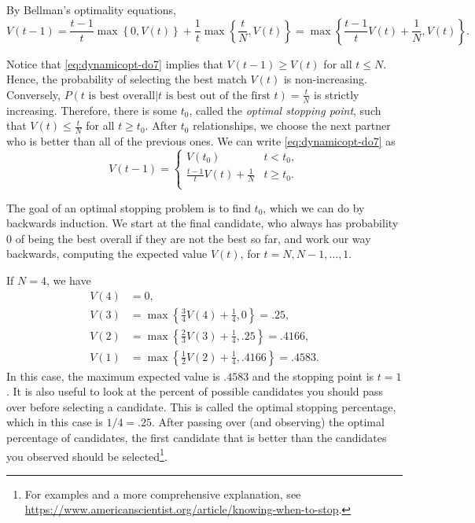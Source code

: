 By Bellman's optimality equations,
\begin{equation}
\label{eq:dynamicopt-do7}
V(t-1) = \frac{t-1}{t}\max\left\{0,V(t)\right\}+\frac{1}{t}\max\left\{ \frac{t}{N},V(t)\right\} = \max\left\{\frac{t-1}{t}V(t)+\frac{1}{N},V(t)\right\}.
\end{equation}

Notice that \eqref{eq:dynamicopt-do7} implies that $V(t-1)\geq V(t)$ for all $t\leq N$.
Hence, the probability of selecting the best match $V(t)$ is non-increasing.
Conversely, $P(t \text{ is best overall}|\text{$t$ is best out of the first $t$})=\frac{t}{N}$ is strictly increasing.
Therefore, there is some $t_0$, called the \emph{optimal stopping point}, such that $V(t)\leq\frac{t}{N}$ for all $t\geq t_0$.
After $t_0$ relationships, we choose the next partner who is better than all of the previous ones.
We can write \eqref{eq:dynamicopt-do7} as
\[
V(t-1) =
    \begin{cases}
    V(t_0) & t<t_0,\\
    \frac{t-1}{t}V(t)+\frac{1}{N} & t\geq t_0.\\
    \end{cases}
\]

The goal of an optimal stopping problem is to find $t_0$, which we can do by backwards induction.
We start at the final candidate, who always has probability $0$ of being the best overall if they are not the best so far, and work our way backwards, computing the expected value $V(t)$, for $t=N,N-1,\ldots,1$.

If $N=4$, we have
\begin{align*}
V(4) &= 0, \\
V(3) &= \max\left\{\frac{3}{4}V(4)+\frac{1}{4},0\right\} = .25,\\
V(2) &= \max\left\{\frac{2}{3}V(3)+\frac{1}{4},.25\right\} = .4166,\\
V(1) &= \max\left\{\frac{1}{2}V(2)+\frac{1}{4},.4166\right\}= .4583.
\end{align*}
In this case, the maximum expected value is $.4583$ and the stopping point is $t=1$.
It is also useful to look at the percent of possible candidates you should pass over before selecting a candidate.
This is called the optimal stopping percentage, which in this case is $1/4=.25$.
After passing over (and observing) the optimal percentage of candidates, the first candidate that is better than the candidates you observed should be selected\footnote{For examples and a more comprehensive explanation, see \url{https://www.americanscientist.org/article/knowing-when-to-stop}.}.

